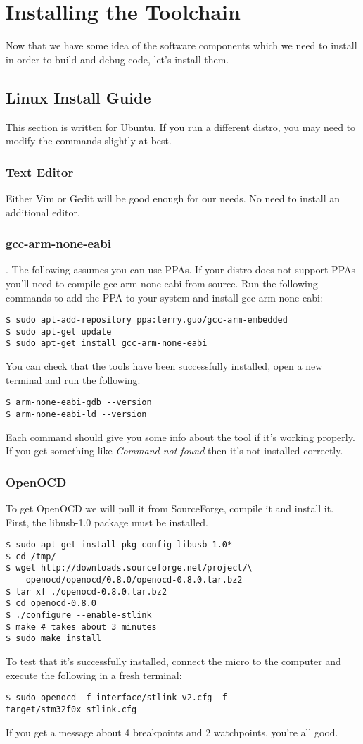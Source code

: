 \chapter{Installing the Toolchain}
Now that we have some idea of the software components which we need to install in order to build and debug code, let's install them.

\section{Linux Install Guide}
This section is written for Ubuntu. If you run a different distro, you may need to modify the commands slightly at best.
\subsection{Text Editor}
Either Vim or Gedit will be good enough for our needs. No need to install an additional editor.

\subsection{gcc-arm-none-eabi}.
The following assumes you can use PPAs. If your distro does not support PPAs you'll need to compile gcc-arm-none-eabi from source.
Run the following commands to add the PPA to your system and install gcc-arm-none-eabi:
\begin{lstlisting}[style=BashStyle]
$ sudo apt-add-repository ppa:terry.guo/gcc-arm-embedded
$ sudo apt-get update
$ sudo apt-get install gcc-arm-none-eabi
\end{lstlisting}
You can check that the tools have been successfully installed, open a new terminal and run the following. 
\begin{lstlisting}[style=BashStyle]
$ arm-none-eabi-gdb --version
$ arm-none-eabi-ld --version
\end{lstlisting}
Each command should give you some info about the tool if it's working properly. If you get something like \textit{Command not found} then it's not installed correctly.

\subsection{OpenOCD}
To get OpenOCD we will pull it from SourceForge, compile it and install it. First, the libusb-1.0 package must be installed.
\begin{lstlisting}[style=BashStyle]
$ sudo apt-get install pkg-config libusb-1.0*
$ cd /tmp/
$ wget http://downloads.sourceforge.net/project/\
    openocd/openocd/0.8.0/openocd-0.8.0.tar.bz2
$ tar xf ./openocd-0.8.0.tar.bz2 
$ cd openocd-0.8.0
$ ./configure --enable-stlink
$ make # takes about 3 minutes
$ sudo make install
\end{lstlisting}
To test that it's successfully installed, connect the micro to the computer and execute the following in a fresh terminal:
\begin{lstlisting}[style=BashStyle]
$ sudo openocd -f interface/stlink-v2.cfg -f target/stm32f0x_stlink.cfg
\end{lstlisting}
If you get a message about 4 breakpoints and 2 watchpoints, you're all good.

